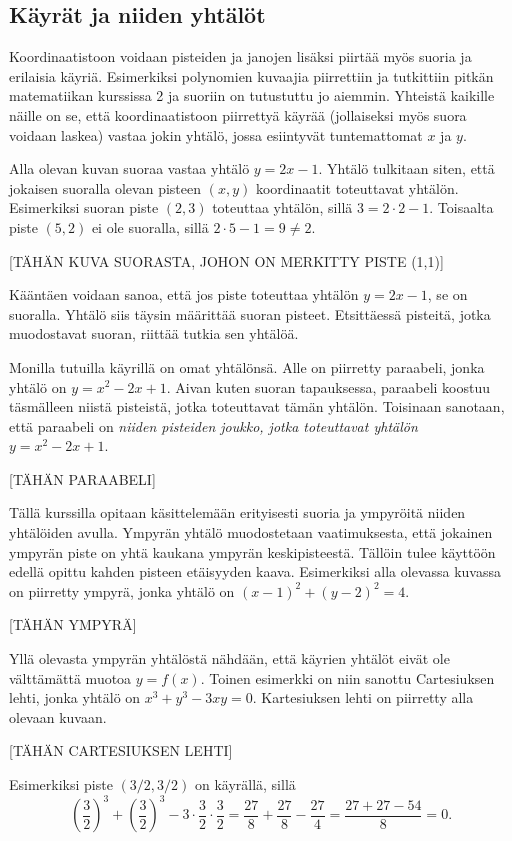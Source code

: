 \subsection{Käyrät ja niiden yhtälöt}

Koordinaatistoon voidaan pisteiden ja janojen lisäksi piirtää myös suoria ja erilaisia käyriä.
Esimerkiksi polynomien kuvaajia piirrettiin ja tutkittiin pitkän matematiikan kurssissa 2 ja suoriin on tutustuttu jo aiemmin.
Yhteistä kaikille näille on se, että koordinaatistoon piirrettyä käyrää (jollaiseksi myös suora voidaan laskea) vastaa jokin yhtälö, jossa esiintyvät tuntemattomat $x$ ja $y$.

Alla olevan kuvan suoraa vastaa yhtälö $y=2x-1$.
Yhtälö tulkitaan siten, että jokaisen suoralla olevan pisteen $(x, y)$ koordinaatit toteuttavat yhtälön.
Esimerkiksi suoran piste $(2, 3)$ toteuttaa yhtälön, sillä $3=2\cdot 2-1$.
Toisaalta piste $(5 ,2)$ ei ole suoralla, sillä $2\cdot 5-1=9\neq 2$.

[TÄHÄN KUVA SUORASTA, JOHON ON MERKITTY PISTE (1,1)]

Kääntäen voidaan sanoa, että jos piste toteuttaa yhtälön $y=2x-1$, se on suoralla.
Yhtälö siis täysin määrittää suoran pisteet.
Etsittäessä pisteitä, jotka muodostavat suoran, riittää tutkia sen yhtälöä.

Monilla tutuilla käyrillä on omat yhtälönsä.
Alle on piirretty paraabeli, jonka yhtälö on $y=x^2-2x+1$.
Aivan kuten suoran tapauksessa, paraabeli koostuu täsmälleen niistä pisteistä, jotka toteuttavat tämän yhtälön.
Toisinaan sanotaan, että paraabeli on \emph{niiden pisteiden joukko, jotka toteuttavat yhtälön $y=x^2-2x+1$}.

[TÄHÄN PARAABELI]

Tällä kurssilla opitaan käsittelemään erityisesti suoria ja ympyröitä niiden yhtälöiden avulla.
Ympyrän yhtälö muodostetaan vaatimuksesta, että jokainen ympyrän piste on yhtä kaukana ympyrän keskipisteestä.
Tällöin tulee käyttöön edellä opittu kahden pisteen etäisyyden kaava.
Esimerkiksi alla olevassa kuvassa on piirretty ympyrä, jonka yhtälö on $(x-1)^2+(y-2)^2=4$.

[TÄHÄN YMPYRÄ]

Yllä olevasta ympyrän yhtälöstä nähdään, että käyrien yhtälöt eivät ole välttämättä muotoa $y=f(x)$.
Toinen esimerkki on niin sanottu Cartesiuksen lehti, jonka yhtälö on $x^3+y^3-3xy=0$.
Kartesiuksen lehti on piirretty alla olevaan kuvaan.

[TÄHÄN CARTESIUKSEN LEHTI]

Esimerkiksi piste $(3/2, 3/2)$ on käyrällä, sillä
\[
\left(\frac{3}{2}\right)^3+\left(\frac{3}{2}\right)^3-3\cdot\frac{3}{2}\cdot\frac{3}{2}
=\frac{27}{8}+\frac{27}{8}-\frac{27}{4}=\frac{27+27-54}{8}=0.
\]

